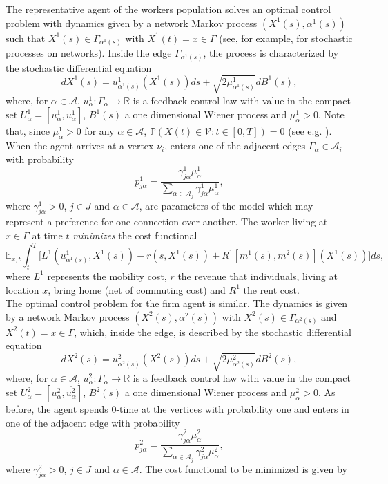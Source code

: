 \documentclass[smallextended,referee,envcountsect,]{svjour3}
\newcommand{\R}{{\mathbb{R}}}
\newcommand{\lra}{\longrightarrow}
\newcommand{\G}{\Gamma}
\newcommand{\cA}{{\mathcal A}}
\newcommand{\cV}{{\mathcal V}}
\renewcommand{\a}{{\alpha}}
\begin{document}
The representative agent of the workers population solves an optimal control problem with dynamics given by a network Markov process $(X^1(s), \alpha^1(s))$ such that $X^1(s)\in \G_{\a^1(s)}$ with $X^1(t)=x\in \G$ (see, for example, \cite{freidlin2} for stochastic processes on networks). Inside the edge $\Gamma_{\alpha^1(s)}$, the process is characterized by the stochastic differential equation
$$
dX^1(s)= u^1_{\a^1(s)}(X^1(s))ds+\sqrt{2\mu^1_{\alpha^1(s)}}dB^1(s),
$$
where, for $\alpha\in \cA$, $u^1_{\a}:\G_\a\lra\R$ is a feedback control law with value in the compact set $U^1_{\a}=[\underline{u^1_{\a}}, \overline{u^1_{\a}}]$, $B^1(s)$  a one dimensional Wiener process and $\mu^1_\a>0$. Note that, since $\mu^1_\a>0$ for any $\a\in\cA$, $\mathbb{P}(X(t)\in \cV: t\in [0,T])=0$ (see e.g. \cite{ohavi}). When the agent arrives at a vertex $\nu_i$, enters one of the adjacent edges $\G_\a \in \cA_{i}$ with probability
$$
	p^1_{j\a}=\frac{\gamma^1_{j\alpha}\mu^1_{\alpha}}{\sum_{\a\in\cA_j} \gamma^1_{j\alpha}\mu^1_{\alpha}},
$$
where $\gamma^1_{j\alpha}>0$, $j\in J$ and $\a\in\cA$, are parameters of the model which may represent a preference for one connection over another. The worker living at $x\in \Gamma$ at time $t$ {\it minimizes} the cost functional
$$
\mathbb{E}_{x,t}\int_t^T \Big[ L^1(u^1_{\alpha^1(s)},X^1(s))-r(s,X^1(s))+R^1[m^1(s),m^2(s)](X^1(s))\Big]ds,
$$
where $L^1$ represents the mobility cost, $r$ the revenue that individuals, living at location $x$, bring home (net of commuting cost) and $R^1$ the rent cost.\\
The optimal control problem for the  firm agent is similar. The dynamics is given by a network Markov process  $(X^2(s), \a^2(s))$ with $X^2(s)\in \G_{\a^2(s)}$ and $X^2(t)=x\in\G$, which, inside the edge, is described by the stochastic differential equation 
$$
dX^2(s)=u^2_{\a^2(s)}(X^2(s))ds+\sqrt{2\mu^2_{\alpha^2(s)}}dB^2(s),
$$
where, for $\alpha\in \cA$, $u^2_{\a}:\G_\a\lra\R$ is a feedback control law with value in the compact set $U^2_{\a}=[\underline{u^2_{\a}}, \overline{u^2_{\a}}]$, $B^2(s)$ a one dimensional Wiener process and $\mu^2_\a>0$.  As before, the agent spends $0$-time at the vertices with probability one and enters in one of the adjacent edge with probability
\begin{equation}\label{coeff2}
	p^2_{j\a}=\frac{\gamma^2_{j\alpha}\mu^2_{\alpha}}{\sum_{\a\in\cA_j} \gamma^2_{j\alpha}\mu^2_{\alpha}} ,
\end{equation}
where $\gamma^2_{j\alpha}>0$, $j\in J$ and $\a\in\cA$. The cost functional to be minimized is given by
\end{document}
